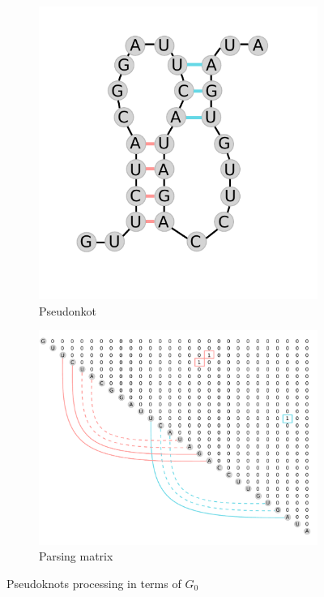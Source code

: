 \documentclass[runningheads]{llncs}
\begin{document}
\begin{figure}[h]
\centering
\begin{subfigure}{.3\textwidth}
  \centering
  \hbox{\includegraphics[width=.9\linewidth]{pics/pk.pdf}}
  \caption{Pseudonkot}
  \label{pk_a}
\end{subfigure}%
\begin{subfigure}{.7\textwidth}
  \centering
  \hbox{\includegraphics[width=.9\linewidth]{pics/matrix_pk.pdf}}
  \caption{Parsing matrix}
  \label{pk_b}
\end{subfigure}
\caption{Pseudoknots processing in terms of $G_0$}
\label{pk}
\end{figure}
\end{document}
